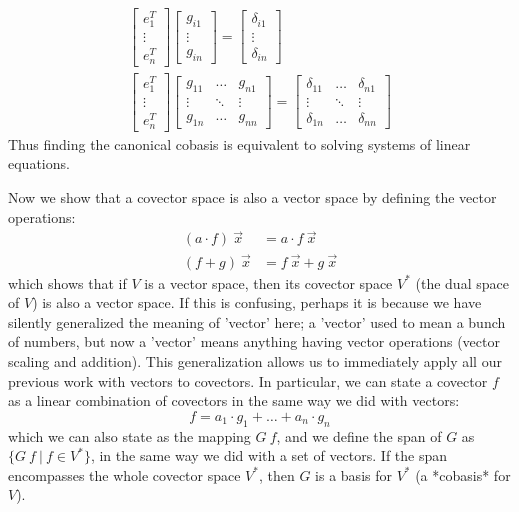\begin{align*}
\begin{bmatrix}e_1^T \\ \vdots \\ e_n^T\end{bmatrix}
\begin{bmatrix}g_{i1} \\ \vdots \\ g_{in}\end{bmatrix}
= \begin{bmatrix}\delta_{i1} \\ \vdots \\ \delta_{in}\end{bmatrix}
\\
\begin{bmatrix}e_1^T \\ \vdots \\ e_n^T\end{bmatrix}
\begin{bmatrix}g_{11} & \ldots & g_{n1} \\ \vdots & \ddots & \vdots \\ g_{1n} & \ldots & g_{nn}\end{bmatrix}
= \begin{bmatrix}\delta_{11} & \ldots & \delta_{n1} \\ \vdots & \ddots & \vdots \\ \delta_{1n} & \ldots & \delta_{nn}\end{bmatrix}
\end{align*}
Thus finding the canonical cobasis is equivalent to solving systems of linear equations.

Now we show that a covector space is also a vector space
by defining the vector operations:
\begin{align*}
(a \cdot f)~\vec{x} &= a \cdot f~\vec{x}
\\ (f+g)~\vec{x} &= f~\vec{x} + g~\vec{x}
\end{align*}
which shows that if $V$ is a vector space,
then its covector space $V^*$
(the dual space of $V$)
is also a vector space.
If this is confusing, perhaps it is because we have silently generalized the meaning of 'vector' here;
a 'vector' used to mean a bunch of numbers,
but now a 'vector' means anything having vector operations (vector scaling and addition).
This generalization allows us to immediately apply all our previous work with vectors to covectors.
In particular, we can state a covector $f$ as a linear combination of covectors
in the same way we did with vectors:
\[
f = a_1 \cdot g_1 + \ldots + a_n \cdot g_n
\]
which we can also state as the mapping $G~f$,
and we define the span of $G$
as $\{ G~f ~|~ f \in V^* \}$, in the same way we did with a set of vectors.
If the span encompasses the whole covector space $V^*$,
then $G$ is a basis for $V^*$ (a *cobasis* for $V$).

